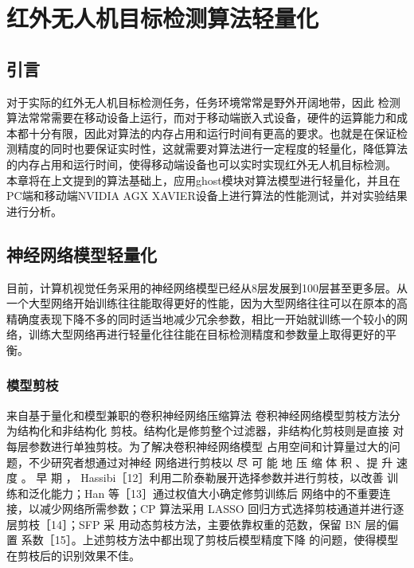 
\chapter{红外无人机目标检测算法轻量化}

\section{引言}
对于实际的红外无人机目标检测任务，任务环境常常是野外开阔地带，因此
检测算法常常需要在移动设备上运行，而对于移动端嵌入式设备，硬件的运算能力和成本都十分有限，因此对算法的内存占用和运行时间有更高的要求。也就是在保证检测精度的同时也要保证实时性，这就需要对算法进行一定程度的轻量化，降低算法的内存占用和运行时间，使得移动端设备也可以实时实现红外无人机目标检测。
本章将在上文提到的算法基础上，应用ghost模块对算法模型进行轻量化，并且在PC端和移动端NVIDIA AGX XAVIER设备上进行算法的性能测试，并对实验结果进行分析。

\section{神经网络模型轻量化}
目前，计算机视觉任务采用的神经网络模型已经从8层发展到100层甚至更多层。从一个大型网络开始训练往往能取得更好的性能，因为大型网络往往可以在原本的高精确度表现下降不多的同时适当地减少冗余参数，相比一开始就训练一个较小的网络，训练大型网络再进行轻量化往往能在目标检测精度和参数量上取得更好的平衡。

\subsection{模型剪枝}
来自基于量化和模型兼职的卷积神经网络压缩算法
卷积神经网络模型剪枝方法分为结构化和非结构化
剪枝。结构化是修剪整个过滤器，非结构化剪枝则是直接
对每层参数进行单独剪枝。为了解决卷积神经网络模型
占用空间和计算量过大的问题，不少研究者想通过对神经
网络进行剪枝以 尽 可 能 地 压 缩 体 积 、提 升 速 度 。 早 期 ，
Hassibi［12］利用二阶泰勒展开选择参数并进行剪枝，以改善
训练和泛化能力；Han 等［13］通过权值大小确定修剪训练后
网络中的不重要连接，以减少网络所需参数；CP 算法采用
LASSO 回归方式选择剪枝通道并进行逐层剪枝［14］；SFP 采
用动态剪枝方法，主要依靠权重的范数，保留 BN 层的偏置
系数［15］。上述剪枝方法中都出现了剪枝后模型精度下降
的问题，使得模型在剪枝后的识别效果不佳。

